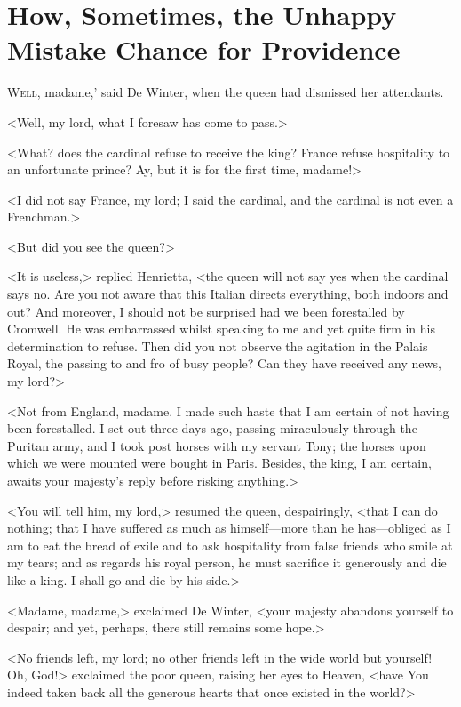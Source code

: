 \chapter[How the Unhappy Mistake Chance for Providence]{How, Sometimes, the Unhappy Mistake Chance for Providence}

 \lettrine[ante=`]{W}{ell}, madame,' said De Winter, when the queen had dismissed her attendants.

\zz
<Well, my lord, what I foresaw has come to pass.>

\zz
<What? does the cardinal refuse to receive the king? France refuse hospitality to an unfortunate prince? Ay, but it is for the first time, madame!>

<I did not say France, my lord; I said the cardinal, and the cardinal is not even a Frenchman.>

<But did you see the queen?>

<It is useless,> replied Henrietta, <the queen will not say yes when the cardinal says no. Are you not aware that this Italian directs everything, both indoors and out? And moreover, I should not be surprised had we been forestalled by Cromwell. He was embarrassed whilst speaking to me and yet quite firm in his determination to refuse. Then did you not observe the agitation in the Palais Royal, the passing to and fro of busy people? Can they have received any news, my lord?>

<Not from England, madame. I made such haste that I am certain of not having been forestalled. I set out three days ago, passing miraculously through the Puritan army, and I took post horses with my servant Tony; the horses upon which we were mounted were bought in Paris. Besides, the king, I am certain, awaits your majesty's reply before risking anything.>

<You will tell him, my lord,> resumed the queen, despairingly, <that I can do nothing; that I have suffered as much as himself—more than he has—obliged as I am to eat the bread of exile and to ask hospitality from false friends who smile at my tears; and as regards his royal person, he must sacrifice it generously and die like a king. I shall go and die by his side.>

<Madame, madame,> exclaimed De Winter, <your majesty abandons yourself to despair; and yet, perhaps, there still remains some hope.>

<No friends left, my lord; no other friends left in the wide world but yourself! Oh, God!> exclaimed the poor queen, raising her eyes to Heaven, <have You indeed taken back all the generous hearts that once existed in the world?>

